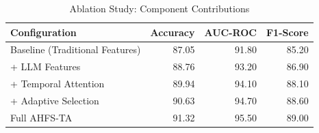 \begin{table}
\caption{Ablation Study: Component Contributions}
\label{tab:ablation_study}
\begin{tabular}{lrrr}
\toprule
Configuration & Accuracy & AUC-ROC & F1-Score \\
\midrule
Baseline (Traditional Features) & 87.05 & 91.80 & 85.20 \\
+ LLM Features & 88.76 & 93.20 & 86.90 \\
+ Temporal Attention & 89.94 & 94.10 & 88.10 \\
+ Adaptive Selection & 90.63 & 94.70 & 88.60 \\
Full AHFS-TA & 91.32 & 95.50 & 89.00 \\
\bottomrule
\end{tabular}
\end{table}
